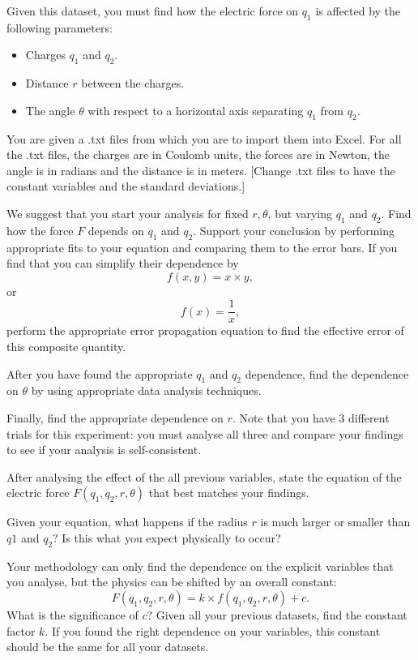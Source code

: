 \documentclass[12pt]{article}
\def\anhkhoi#1{{\color{olive}[#1]}}
\begin{document}
Given this dataset, you must find how the electric force on $q_1$ is affected by the following parameters:
\begin{itemize}
\item Charges $q_1$ and $q_2$.
\item Distance $r$ between the charges.
\item The angle $\theta$ with respect to a horizontal axis separating $q_1$ from $q_2$.
\end{itemize}

You are given a .txt files from which you are to import them into Excel. For all the .txt files, the charges are in Coulomb units, the forces are in Newton, the angle is in radians and the distance is in meters. \anhkhoi{Change .txt files to have the constant variables and the standard deviations.}

We suggest that you start your analysis for fixed $r, \theta$, but varying $q_1$ and $q_2$. Find how the force $F$ depends on $q_1$ and $q_2$. Support your conclusion by performing appropriate fits to your equation and comparing them to the error bars. If you find that you can simplify their dependence by 
\begin{equation}
f(x,y) = x \times y,
\label{Eq:f=xy}
\end{equation}
or 
\begin{equation}
f(x) = \frac{1}{x},
\label{Eq:f=1/x}
\end{equation} 
perform the appropriate error propagation equation to find the effective error of this composite quantity.

After you have found the appropriate $q_1$ and $q_2$ dependence, find the dependence on $\theta$ by using appropriate data analysis techniques.

Finally, find the appropriate dependence on $r$. Note that you have 3 different trials for this experiment: you must analyse all three and compare your findings to see if your analysis is self-consistent.

After analysing the effect of the all previous variables, state the equation of the electric force $F(q_1,q_2,r,\theta)$ that best matches your findings. 

Given your equation, what happens if the radius $r$ is much larger or smaller than $q1$ and $q_2$? Is this what you expect physically to occur?

Your methodology can only find the dependence on the explicit variables that you analyse, but the physics can be shifted by an overall constant:
\begin{equation}
F(q_1, q_2, r, \theta) = k \times  f(q_1,q_2,r,\theta) +c.
\end{equation}
What is the significance of $c$? Given all your previous datasets, find the constant factor $k$. If you found the right dependence on your variables, this constant should be the same for all your datasets.
\end{document}
